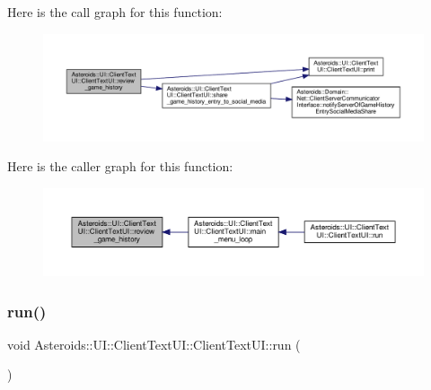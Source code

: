 Here is the call graph for this function\+:
\nopagebreak
\begin{figure}[H]
\begin{center}
\leavevmode
\includegraphics[width=350pt]{classAsteroids_1_1UI_1_1ClientTextUI_1_1ClientTextUI_a27ec39f73edbb3688a3ebe67533abf5a_cgraph}
\end{center}
\end{figure}
Here is the caller graph for this function\+:
\nopagebreak
\begin{figure}[H]
\begin{center}
\leavevmode
\includegraphics[width=350pt]{classAsteroids_1_1UI_1_1ClientTextUI_1_1ClientTextUI_a27ec39f73edbb3688a3ebe67533abf5a_icgraph}
\end{center}
\end{figure}
\mbox{\label{classAsteroids_1_1UI_1_1ClientTextUI_1_1ClientTextUI_a835f455a627e77a5ef99661350281ec3}} 
\subsubsection{\texorpdfstring{run()}{run()}}
{\footnotesize\ttfamily void Asteroids\+::\+U\+I\+::\+Client\+Text\+U\+I\+::\+Client\+Text\+U\+I\+::run (\begin{DoxyParamCaption}{ }\end{DoxyParamCaption})\hspace{0.3cm}{\ttfamily [virtual]}}




